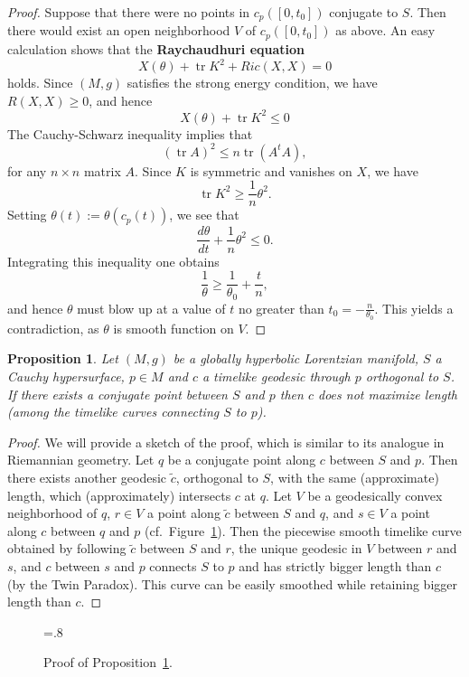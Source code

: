 \documentclass[12pt]{amsart}
\newcommand{\tr}{\operatorname{tr}}
\newtheorem{Prop}[Thm]{Proposition}
\theoremstyle{definition}
\theoremstyle{remark}
\begin{document}
\begin{proof}
Suppose that there were no points in $c_p([0,t_0])$ conjugate to $S$. Then there would exist an open neighborhood $V$ of $c_p([0,t_0])$ as above. An easy calculation shows that the {\bf Raychaudhuri equation}
\[
X(\theta) + \tr K^2 + Ric(X,X) = 0
\]
holds. Since $(M,g)$ satisfies the strong energy condition, we have $R(X,X) \geq 0$, and hence
\[
X(\theta) + \tr K^2 \leq 0
\]
The Cauchy-Schwarz inequality implies that
\[
(\tr A)^2 \leq n \tr(A^tA),
\]
for any $n \times n$ matrix $A$. Since $K$ is symmetric and vanishes on $X$, we have
\[
\tr K^2 \geq \frac1n \theta^2.
\]
Setting $\theta(t):=\theta(c_p(t))$, we see that
\[
\frac{d \theta}{d t} + \frac1n \theta^2 \leq 0.
\] 
Integrating this inequality one obtains
\[
\frac1{\theta} \geq \frac1{\theta_0} + \frac{t}n,
\]
and hence $\theta$ must blow up at a value of $t$ no greater than $t_0=-\frac{n}{\theta_0}$. This yields a contradiction, as $\theta$ is smooth function on $V$.
\end{proof}

\begin{Prop} \label{conjugate_prop}
Let $(M,g)$ be a globally hyperbolic Lorentzian manifold, $S$ a Cauchy hypersurface, $p \in M$ and $c$ a timelike geodesic through $p$ orthogonal to $S$. If there exists a conjugate point between $S$ and $p$ then $c$ does not maximize length (among the timelike curves connecting $S$ to $p$).
\end{Prop}

\begin{proof}
We will provide a sketch of the proof, which is similar to its analogue in Riemannian geometry. Let $q$ be a conjugate point along $c$ between $S$ and $p$. Then there exists another geodesic $\tilde{c}$, orthogonal to $S$, with the same (approximate) length, which (approximately) intersects $c$ at $q$. Let $V$ be a geodesically convex neighborhood of $q$, $r\in V$ a point along $\tilde{c}$ between $S$ and $q$, and $s\in V$ a point along $c$ between $q$ and $p$ (cf.~Figure~\ref{Figure_conj}). Then the piecewise smooth timelike curve obtained by following $\tilde{c}$ between $S$ and $r$, the unique geodesic in $V$ between $r$ and $s$, and $c$ between $s$ and $p$ connects $S$ to $p$ and has strictly bigger length than $c$ (by the Twin Paradox). This curve can be easily smoothed while retaining bigger length than $c$.
\end{proof}

\begin{figure}[h!]
\begin{center}
\epsfxsize=.8\textwidth
\leavevmode
{}
\end{center}
\caption{Proof of Proposition~\ref{conjugate_prop}.} \label{Figure_conj}
\end{figure}
\end{document}
